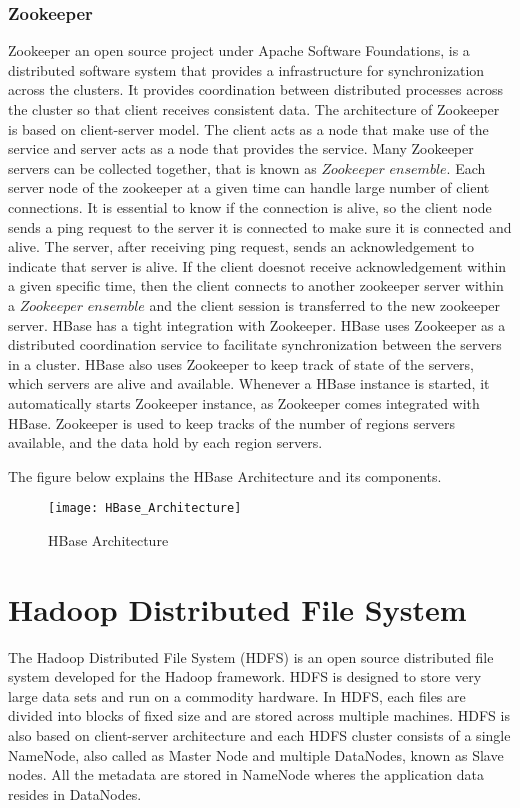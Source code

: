 \documentclass[11pt,a4paper,bibtotoc,idxtotoc,headsepline,footsepline,footexclude,BCOR12mm,DIV13]{scrbook}
\begin{document}
\subsubsection{Zookeeper}
\label{zookeeper}
Zookeeper an open source project under Apache Software Foundations, is a distributed software system that provides a infrastructure for synchronization across the clusters. It provides coordination between distributed processes across the cluster so that client receives consistent data. The architecture of Zookeeper is based on client-server model. The client acts as a node that make use of the service and server acts as a node that provides the service\cite{hbase:zookeeper}. Many Zookeeper servers can be collected together, that is known as $Zookeeper$ $ensemble$\cite{hbase:zookeeper}. Each server node of the zookeeper at a given time can handle large number of client connections. It is essential to know if the connection is alive, so the client node sends a ping request to the server it is connected to make sure it is connected and alive\cite{hbase:zookeeper}. The server, after receiving ping request, sends an acknowledgement to indicate that server is alive. If the client doesnot receive acknowledgement within a given specific time, then the client connects to another zookeeper server within a $Zookeeper$ $ensemble$ and the client session is transferred to the new zookeeper server\cite{hbase:zookeeper}.
\newline
HBase has a tight integration with Zookeeper. HBase uses Zookeeper as a distributed coordination service to facilitate synchronization between the servers in a cluster. HBase also uses Zookeeper to keep track of state of the servers, which servers are alive and available\cite{hbase:architecture}. Whenever a HBase instance is started, it automatically starts Zookeeper instance, as Zookeeper comes integrated with HBase\cite{hbase:insights}. Zookeeper is used to keep tracks of the number of regions servers available, and the data hold by each region servers. 
\newline

The figure below explains the HBase Architecture and its components.
\begin{figure}
	\centering
	\texttt{[image: HBase\_Architecture]}
	\caption{HBase Architecture}
	\label{fig:hbasetable}
\end{figure}

\newpage
\section{Hadoop Distributed File System}
\label{Hadoop Distributed File System}
The Hadoop Distributed File System (HDFS) is an open source distributed file system developed for the Hadoop framework. HDFS is designed to store very large data sets and run on a commodity hardware. In HDFS, each files are divided into blocks of fixed size and are stored across multiple machines\cite{HDFS:architecture}. HDFS is also based on client-server architecture and each HDFS cluster consists of a single NameNode, also called as Master Node and multiple DataNodes, known as Slave nodes. All the metadata are stored in NameNode wheres the application data resides in DataNodes\cite{hadoop:architecture}.
\end{document}
